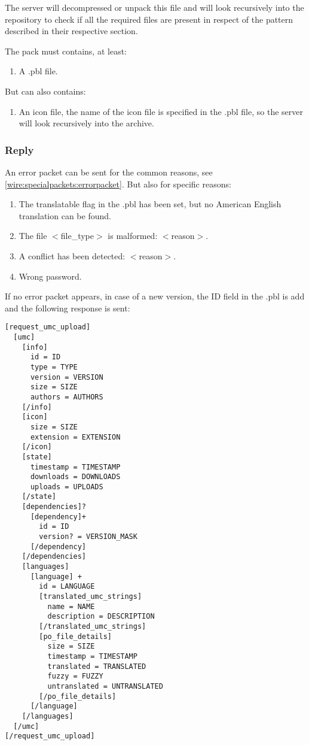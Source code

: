 The server will decompressed or unpack this file and will look recursively into the repository to check
if all the required files are present in respect of the pattern described in their respective section.

The pack must contains, at least:

\begin{enumerate}
  \item A .pbl file.
\end{enumerate}

But can also contains:

\begin{enumerate}
 \item An icon file, the name of the icon file is specified in the .pbl file, so the server will look recursively into the archive.
\end{enumerate}


\subsubsection{Reply}

An error packet can be sent for the common reasons, see \cref{wire:specialpackets:errorpacket}.
But also for specific reasons:

\begin{enumerate}
  \item The translatable flag in the .pbl has been set, but no American English translation can be found.
  \item The file $<$file\_type$>$ is malformed: $<$reason$>$.
  \item A conflict has been detected: $<$reason$>$.
  \item Wrong password.
\end{enumerate}

If no error packet appears, in case of a new version, the ID field in the .pbl is add and
the following response is sent:

\begin{lstlisting}
[request_umc_upload]
  [umc]
    [info]
      id = ID
      type = TYPE
      version = VERSION
      size = SIZE
      authors = AUTHORS
    [/info]
    [icon]
      size = SIZE
      extension = EXTENSION
    [/icon]
    [state]
      timestamp = TIMESTAMP
      downloads = DOWNLOADS
      uploads = UPLOADS
    [/state]
    [dependencies]?
      [dependency]+
        id = ID
        version? = VERSION_MASK
      [/dependency]
    [/dependencies]
    [languages]
      [language] +
        id = LANGUAGE
        [translated_umc_strings]
          name = NAME
          description = DESCRIPTION
        [/translated_umc_strings]
        [po_file_details]
          size = SIZE
          timestamp = TIMESTAMP
          translated = TRANSLATED
          fuzzy = FUZZY
          untranslated = UNTRANSLATED
        [/po_file_details]
      [/language]
    [/languages]
  [/umc]
[/request_umc_upload]
\end{lstlisting}

